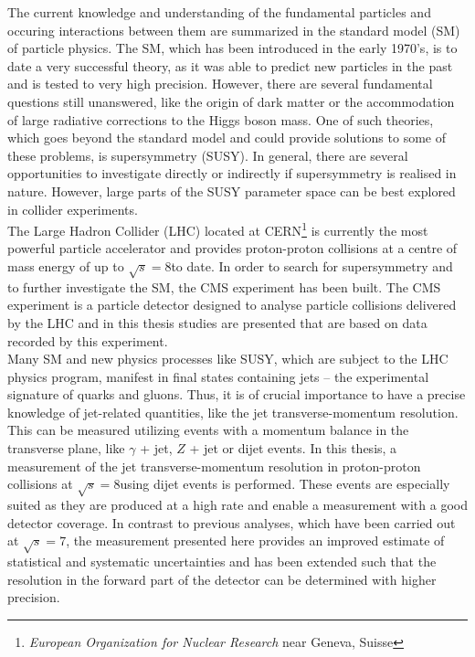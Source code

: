 The current knowledge and understanding of the fundamental particles and occuring interactions between them are summarized in the standard model (SM) of particle physics. The SM, which has been introduced in the early 1970's, is to date a very successful theory, as it was able to predict new particles in the past and is tested to very high precision. However, there are several fundamental questions still unanswered, like the origin of dark matter or the accommodation of large radiative corrections to the Higgs boson mass. One of such theories, which goes beyond the standard model and could provide solutions to some of these problems, is supersymmetry (SUSY). In general, there are several opportunities to investigate directly or indirectly if supersymmetry is realised in nature. However, large parts of the SUSY parameter space can be best explored in collider experiments. \\
The Large Hadron Collider (LHC) located at CERN\footnote{\textit{European Organization for Nuclear Research} near Geneva, Suisse} is currently the most powerful particle accelerator and provides proton-proton collisions at a centre of mass energy of up to $\sqrt{s} = 8$\tev to date. In order to search for supersymmetry and to further investigate the SM, the CMS experiment has been built. The CMS experiment is a particle detector designed to analyse particle collisions delivered by the LHC and in this thesis studies are presented that are based on data recorded by this experiment. \\ 
Many SM and new physics processes like SUSY, which are subject to the LHC physics program, manifest in final states containing jets -- the experimental signature of quarks and gluons. Thus, it is of crucial importance to have a precise knowledge of jet-related quantities, like the jet transverse-momentum resolution. This can be measured utilizing events with a momentum balance in the transverse plane, like $\gamma$ + jet, $Z$ + jet or dijet events. In this thesis, a measurement of the jet transverse-momentum resolution in proton-proton collisions at $\sqrt{s} = 8$\tev using dijet events is performed. These events are especially suited as they are produced at a high rate and enable a measurement with a good detector coverage. In contrast to previous analyses, which have been carried out at $\sqrt{s} = 7$\tev, the measurement presented here provides an improved estimate of statistical and systematic uncertainties and has been extended such that the resolution in the forward part of the detector can be determined with higher precision. \\
